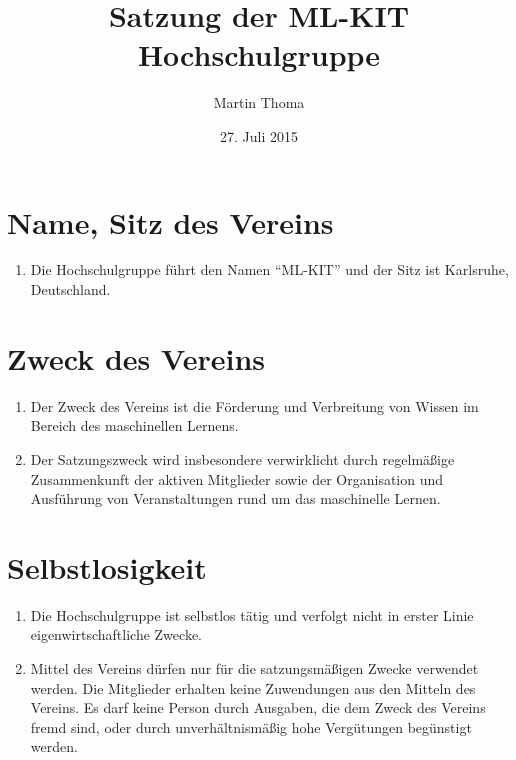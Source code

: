 \documentclass[a4paper]{scrartcl}
\newcommand\GruppenName{ML-KIT}
\begin{document}
 \author{Martin Thoma}
 \title{Satzung der \GruppenName{} Hochschulgruppe}
 \date{27. Juli 2015}

 \maketitle

\section{Name, Sitz des Vereins}
\begin{enumerate}
    \item Die Hochschulgruppe führt den Namen \enquote{\GruppenName{}} und der Sitz ist
          Karlsruhe, Deutschland.
\end{enumerate}

\section{Zweck des Vereins}
\begin{enumerate}
    \item Der Zweck des Vereins ist die Förderung und Verbreitung von Wissen
          im Bereich des maschinellen Lernens.
    \item Der Satzungszweck wird insbesondere verwirklicht durch regelmäßige
          Zusammenkunft der aktiven Mitglieder sowie der Organisation und
          Ausführung von Veranstaltungen rund um das maschinelle Lernen.
\end{enumerate}


\section{Selbstlosigkeit}
\begin{enumerate}
    \item Die Hochschulgruppe ist selbstlos tätig und verfolgt nicht in erster
          Linie eigenwirtschaftliche Zwecke.
    \item Mittel des Vereins dürfen nur für die satzungsmäßigen Zwecke
          verwendet werden. Die Mitglieder erhalten keine Zuwendungen aus den
          Mitteln des Vereins. Es darf keine Person durch Ausgaben, die dem
          Zweck des Vereins fremd sind, oder durch unverhältnismäßig hohe
          Vergütungen begünstigt werden.
\end{enumerate}
\end{document}

